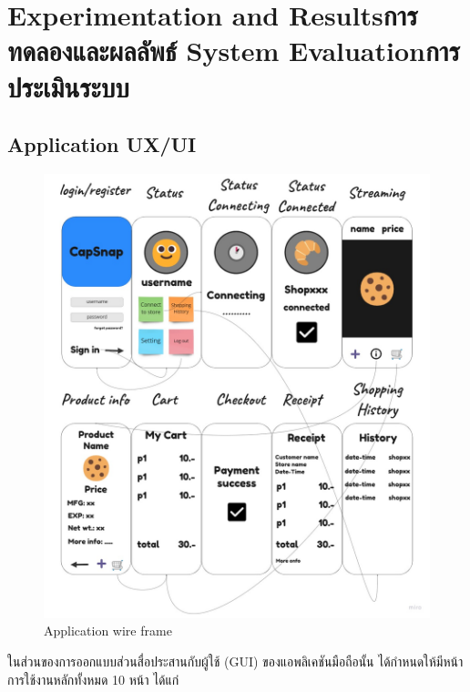 \chapter{\ifproject%
\ifenglish Experimentation and Results\else การทดลองและผลลัพธ์\fi
\else%
\ifenglish System Evaluation\else การประเมินระบบ\fi
\fi}

\section{Application UX/UI}
\begin{figure}[h]
    \begin{center}
    \includegraphics[scale=0.25]{pic/ui/mobileui.jpg}
    \end{center}
    
    \caption[Application wire frame]{Application wire frame}
    \label{fig:Application wire frame}
    \end{figure} 

ในส่วนของการออกแบบส่วนสื่อประสานกับผู้ใช้ (GUI) ของแอพลิเคชันมือถือนั้น ได้กำหนดให้มีหน้าการใช้งานหลักทั้งหมด 10 หน้า ได้แก่
 
